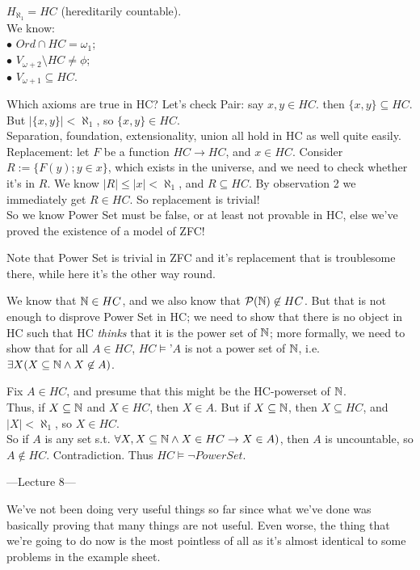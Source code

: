 \documentclass[a4paper]{article}
\begin{document}
\begin{eg}
$H_{\aleph_1} = HC$ (hereditarily countable).\\
We know:\\
$\bullet$ $Ord \cap HC = \omega_1$;\\
$\bullet$ $V_{\omega+2} \setminus HC \neq \phi$;\\
$\bullet$ $V_{\omega+1} \subseteq HC$.

Which axioms are true in HC? Let's check Pair: say $x,y \in HC$. then $\{x,y\} \subseteq HC$. But $|\{x,y\}| < \aleph_1$, so $\{x,y\} \in HC$.\\
Separation, foundation, extensionality, union all hold in HC as well quite easily.\\
Replacement: let $F$ be a function $HC \to HC$, and $x \in HC$. Consider $R:=\{ F(y);y \in x\}$, which exists in the universe, and we need to check whether it's in $R$. We know $|R| \leq |x| < \aleph_1$, and $R \subseteq HC$. By observation 2 we immediately get $R \in HC$. So replacement is trivial!\\
So we know Power Set must be false, or at least not provable in HC, else we've proved the existence of a model of ZFC!

Note that Power Set is trivial in ZFC and it's replacement that is troublesome there, while here it's the other way round.

We know that $\mathbb{N} \in HC$, and we also know that $\mathcal{P}(\mathbb{N}) \not\in HC$. But that is not enough to disprove Power Set in HC; we need to show that there is no object in HC such that HC \emph{thinks} that it is the power set of $\mathbb{N}$; more formally, we need to show that for all $A \in HC$, $HC \vDash $'$A$ is not a power set of $\mathbb{N}$, i.e. $\exists X (X \subseteq \mathbb{N} \wedge X \not\in A)$.

Fix $A \in HC$, and presume that this might be the HC-powerset of $\mathbb{N}$.\\
Thus, if $X \subseteq \mathbb{N}$ and $X \in HC$, then $X \in A$. But if $X \subseteq \mathbb{N}$, then $X \subseteq HC$, and $|X| < \aleph_1$, so $X \in HC$.\\
So if $A$ is any set s.t. $\forall X, X \subseteq \mathbb{N} \wedge X \in HC \to X \in A)$, then $A$ is uncountable, so $A \not\in HC$. Contradiction. Thus $HC \vDash \neg Power Set$.\	
\end{eg}

---Lecture 8---

We've not been doing very useful things so far since what we've done was basically proving that many things are not useful. Even worse, the thing that we're going to do now is the most pointless of all as it's almost identical to some problems in the example sheet.
\end{document}
